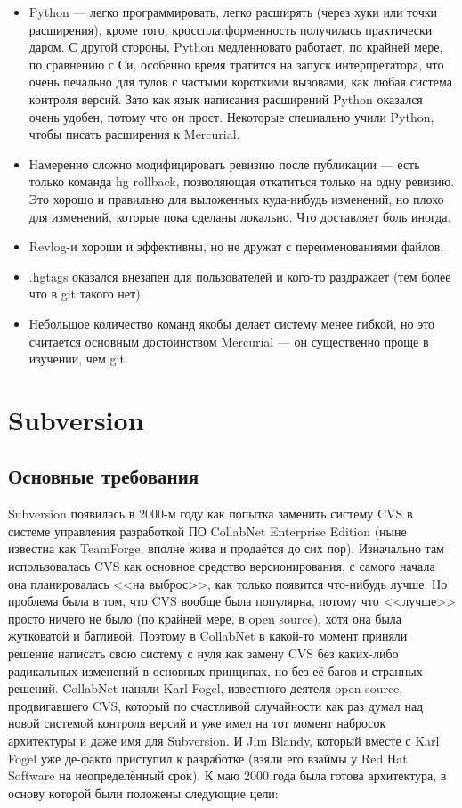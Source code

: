 \documentclass[a5paper]{article}
\begin{document}
\begin{itemize}
    \item Python --- легко программировать, легко расширять (через хуки или точки расширения), кроме того, кроссплатформенность получилась практически даром. С другой стороны, Python медленновато работает, по крайней мере, по сравнению с Си, особенно время тратится на запуск интерпретатора, что очень печально для тулов с частыми короткими вызовами, как любая система контроля версий. Зато как язык написания расширений Python оказался очень удобен, потому что он прост. Некоторые специально учили Python, чтобы писать расширения к Mercurial.
    \item Намеренно сложно модифицировать ревизию после публикации --- есть только команда hg rollback, позволяющая откатиться только на одну ревизию. Это хорошо и правильно для выложенных куда-нибудь изменений, но плохо для изменений, которые пока сделаны локально. Что доставляет боль иногда.
    \item Revlog-и хороши и эффективны, но не дружат с переименованиями файлов.
    \item .hgtags оказался внезапен для пользователей и кого-то раздражает (тем более что в git такого нет).
    \item Небольшое количество команд якобы делает систему менее гибкой, но это считается основным достоинством Mercurial --- он существенно проще в изучении, чем git.
\end{itemize}

\section{Subversion}

\subsection{Основные требования}

Subversion появилась в 2000-м году как попытка заменить систему CVS в системе управления разработкой ПО CollabNet Enterprise Edition (ныне известна как TeamForge, вполне жива и продаётся до сих пор). Изначально там использовалась CVS как основное средство версионирования, с самого начала она планировалась <<на выброс>>, как только появится что-нибудь лучше. Но проблема была в том, что CVS вообще была популярна, потому что <<лучше>> просто ничего не было (по крайней мере, в open source), хотя она была жутковатой и багливой. Поэтому в CollabNet в какой-то момент приняли решение написать свою систему с нуля как замену CVS без каких-либо радикальных изменений в основных принципах, но без её багов и странных решений. CollabNet наняли Karl Fogel, известного деятеля open source, продвигавшего CVS, который по счастливой случайности как раз думал над новой системой контроля версий и уже имел на тот момент набросок архитектуры и даже имя для Subversion. И Jim Blandy, который вместе с Karl Fogel уже де-факто приступил к разработке (взяли его взаймы у Red Hat Software на неопределённый срок). К маю 2000 года была готова архитектура, в основу которой были положены следующие цели:
\end{document}

